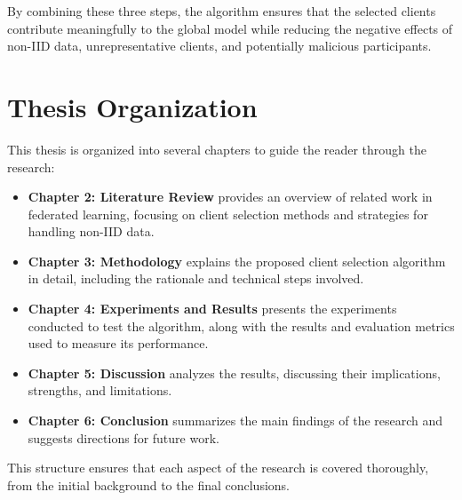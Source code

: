 By combining these three steps, the algorithm ensures that the selected clients
contribute meaningfully to the global model while reducing the negative effects
of non-IID data, unrepresentative clients, and potentially malicious
participants.

\section{Thesis Organization}
This thesis is organized into several chapters to guide the reader through the
research:

\begin{itemize}
      \item \textbf{Chapter 2: Literature Review} provides an overview of
            related
            work in federated learning, focusing on client selection methods
            and
            strategies
            for handling non-IID data.
      \item \textbf{Chapter 3: Methodology} explains the proposed client
            selection algorithm in detail, including the rationale and
            technical
            steps
            involved.
      \item \textbf{Chapter 4: Experiments and Results} presents the
            experiments
            conducted to test the algorithm, along with the results and
            evaluation metrics
            used to measure its performance.
      \item \textbf{Chapter 5: Discussion} analyzes the results, discussing
            their
            implications, strengths, and limitations.
      \item \textbf{Chapter 6: Conclusion} summarizes the main findings of the
            research and suggests directions for future work.
\end{itemize}

This structure ensures that each aspect of the research is covered thoroughly,
from the initial background to the final conclusions.
